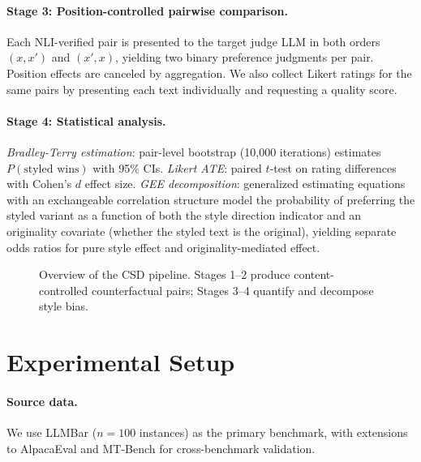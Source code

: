 \documentclass[11pt]{article}
\begin{document}
\paragraph{Stage 3: Position-controlled pairwise comparison.}
Each NLI-verified pair is presented to the target judge LLM in both orders $(x, x')$ and $(x', x)$, yielding two binary preference judgments per pair.
Position effects are canceled by aggregation.
We also collect Likert ratings for the same pairs by presenting each text individually and requesting a quality score.

\paragraph{Stage 4: Statistical analysis.}
\emph{Bradley-Terry estimation}: pair-level bootstrap (10{,}000 iterations) estimates $P(\text{styled wins})$ with 95\% CIs.
\emph{Likert ATE}: paired $t$-test on rating differences with Cohen's $d$ effect size.
\emph{GEE decomposition}: generalized estimating equations with an exchangeable correlation structure model the probability of preferring the styled variant as a function of both the style direction indicator and an originality covariate (whether the styled text is the original), yielding separate odds ratios for pure style effect and originality-mediated effect.

\begin{figure}[t]
\centering
{}
\caption{Overview of the CSD pipeline. Stages 1--2 produce content-controlled counterfactual pairs; Stages 3--4 quantify and decompose style bias.}
\label{fig:pipeline}
\end{figure}

\section{Experimental Setup}
\label{sec:setup}

\paragraph{Source data.}
We use LLMBar \citep{zeng2024llmbar} ($n = 100$ instances) as the primary benchmark, with extensions to AlpacaEval \citep{dubois2024alpacafarm} and MT-Bench \citep{zheng2023judging} for cross-benchmark validation.
\end{document}
